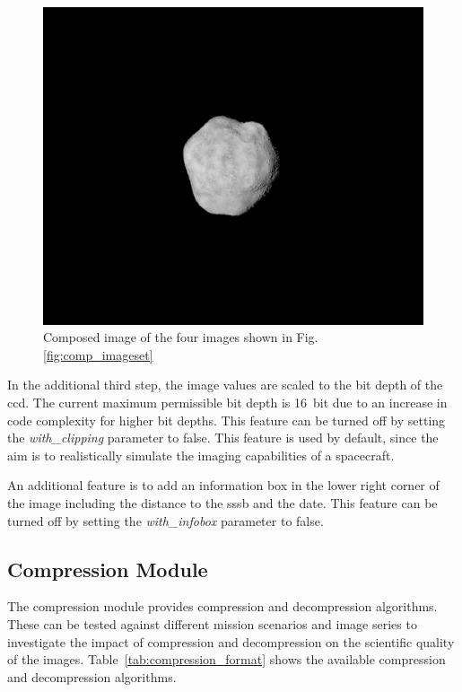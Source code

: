 \begin{figure}[htb]
    \centering
    \includegraphics[width=\textwidth]{doc/thesis/0_figures/composition/Comp_2017-08-15T115854-575000.png}
    \caption{Composed image of the four images shown in Fig. \ref{fig:comp_imageset}}
    \label{fig:comp_composed}
\end{figure}

In the additional third step, the image values are scaled to the bit depth of the \gls{ccd}. The current maximum permissible bit depth is \SI{16}{bit} due to an increase in code complexity for higher bit depths. This feature can be turned off by setting the \textit{with\_clipping} parameter to false. This feature is used by default, since the aim is to realistically simulate the imaging capabilities of a spacecraft.

An additional feature is to add an information box in the lower right corner of the image including the distance to the \gls{sssb} and the date. This feature can be turned off by setting the \textit{with\_infobox} parameter to false.

\subsection{Compression Module}
The compression module provides compression and decompression algorithms. These can be tested against different mission scenarios and image series to investigate the impact of compression and decompression on the scientific quality of the images. Table~\ref{tab:compression_format} shows the available compression and decompression algorithms.

